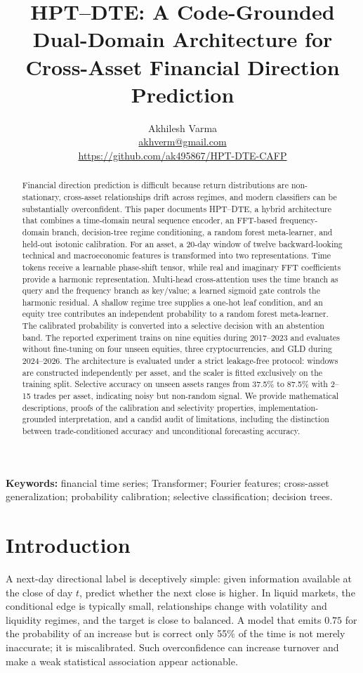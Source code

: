 \documentclass[11pt]{article}
\title{HPT--DTE: A Code-Grounded Dual-Domain Architecture for Cross-Asset Financial Direction Prediction}
\author{Akhilesh Varma\\\small \href{mailto:akhverm@gmail.com}{akhverm@gmail.com}\\[-2pt]\small \url{https://github.com/ak495867/HPT-DTE-CAFP}}
\date{}
\begin{document}
\maketitle
\begin{abstract}
Financial direction prediction is difficult because return distributions are non-stationary, cross-asset relationships drift across regimes, and modern classifiers can be substantially overconfident. This paper documents HPT--DTE, a hybrid architecture that combines a time-domain neural sequence encoder, an FFT-based frequency-domain branch, decision-tree regime conditioning, a random forest meta-learner, and held-out isotonic calibration. For an asset, a 20-day window of twelve backward-looking technical and macroeconomic features is transformed into two representations. Time tokens receive a learnable phase-shift tensor, while real and imaginary FFT coefficients provide a harmonic representation. Multi-head cross-attention uses the time branch as query and the frequency branch as key/value; a learned sigmoid gate controls the harmonic residual. A shallow regime tree supplies a one-hot leaf condition, and an equity tree contributes an independent probability to a random forest meta-learner. The calibrated probability is converted into a selective decision with an abstention band. The reported experiment trains on nine equities during 2017--2023 and evaluates without fine-tuning on four unseen equities, three cryptocurrencies, and GLD during 2024--2026. The architecture is evaluated under a strict leakage-free protocol: windows are constructed independently per asset, and the scaler is fitted exclusively on the training split. Selective accuracy on unseen assets ranges from 37.5\% to 87.5\% with 2--15 trades per asset, indicating noisy but non-random signal. We provide mathematical descriptions, proofs of the calibration and selectivity properties, implementation-grounded interpretation, and a candid audit of limitations, including the distinction between trade-conditioned accuracy and unconditional forecasting accuracy.
\end{abstract}

\textbf{Keywords:} financial time series; Transformer; Fourier features; cross-asset generalization; probability calibration; selective classification; decision trees.

\section{Introduction}
A next-day directional label is deceptively simple: given information available at the close of day $t$, predict whether the next close is higher. In liquid markets, the conditional edge is typically small, relationships change with volatility and liquidity regimes, and the target is close to balanced. A model that emits $0.75$ for the probability of an increase but is correct only 55\% of the time is not merely inaccurate; it is miscalibrated. Such overconfidence can increase turnover and make a weak statistical association appear actionable.
\end{document}
